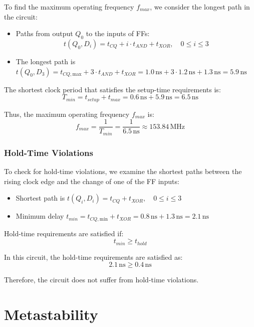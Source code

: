 \documentclass[12pt,openany]{book}
\begin{document}
To find the maximum operating frequency $f_{max}$, we consider the longest path in the circuit:
\begin{itemize}
    \item[] Paths from output $Q_0$ to the inputs of FFs:
    \[
    t(Q_0, D_i) = t_{CQ} + i \cdot t_{AND} + t_{XOR}, \quad 0 \le i \le 3
    \]
    \item[] The longest path is $t(Q_0, D_3) = t_{CQ,\text{max}} + 3 \cdot t_{AND} + t_{XOR} = 1.0 \, \text{ns} + 3 \cdot 1.2 \, \text{ns} + 1.3 \, \text{ns} = 5.9 \, \text{ns}$
\end{itemize}

The shortest clock period that satisfies the setup-time requirements is:
\[
T_{min} = t_{setup} + t_{max} = 0.6 \, \text{ns} + 5.9 \, \text{ns} = 6.5 \, \text{ns}
\]

Thus, the maximum operating frequency $f_{max}$ is:
\[
f_{max} = \frac{1}{T_{min}} = \frac{1}{6.5 \, \text{ns}} \approx 153.84 \, \text{MHz}
\]

\subsubsection{Hold-Time Violations}

To check for hold-time violations, we examine the shortest paths between the rising clock edge and the change of one of the FF inputs:
\begin{itemize}
    \item[] Shortest path is $t(Q_i, D_i) = t_{CQ} + t_{XOR}, \quad 0 \le i \le 3$
    \item[] Minimum delay $t_{min} = t_{CQ,\text{min}} + t_{XOR} = 0.8 \, \text{ns} + 1.3 \, \text{ns} = 2.1 \, \text{ns}$
\end{itemize}

Hold-time requirements are satisfied if:
\[
t_{min} \ge t_{hold}
\]

In this circuit, the hold-time requirements are satisfied as:
\[
2.1 \, \text{ns} \ge 0.4 \, \text{ns}
\]

Therefore, the circuit does not suffer from hold-time violations.

\section{Metastability}
\end{document}
